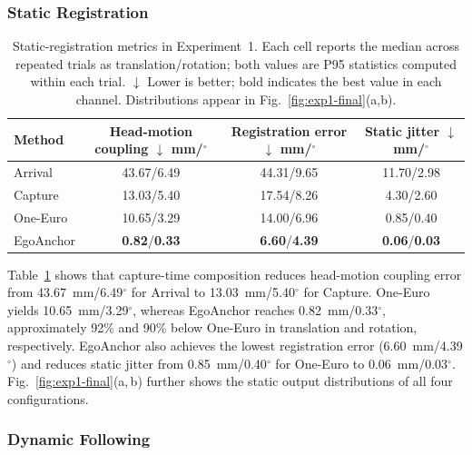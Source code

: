 \documentclass[review]{vgtc}
\begin{document}
\subsubsection{Static Registration}

\begin{table}[t]
\centering
\caption{Static-registration metrics in Experiment~1. Each cell reports the median across repeated trials as translation/rotation; both values are P95 statistics computed within each trial. $\downarrow$ Lower is better; bold indicates the best value in each channel. Distributions appear in Fig.~\ref{fig:exp1-final}(a,b).}
\label{tab:exp1-static}
\begin{tabular}{@{}lccc@{}}
\toprule
Method & \makecell{Head-motion\\coupling $\downarrow$\\mm/$^\circ$} & \makecell{Registration\\error $\downarrow$\\mm/$^\circ$} & \makecell{\\Static jitter $\downarrow$\\mm/$^\circ$} \\
\midrule
Arrival   & 43.67/6.49 & 44.31/9.65 & 11.70/2.98 \\
Capture   & 13.03/5.40 & 17.54/8.26 & 4.30/2.60 \\
One-Euro  & 10.65/3.29 & 14.00/6.96 & 0.85/0.40 \\
EgoAnchor & \textbf{0.82}/\textbf{0.33} & \textbf{6.60}/\textbf{4.39} & \textbf{0.06}/\textbf{0.03} \\
\bottomrule
\end{tabular}
\end{table}

Table~\ref{tab:exp1-static} shows that capture-time composition reduces head-motion coupling error from 43.67~mm/6.49$^\circ$ for Arrival to 13.03~mm/5.40$^\circ$ for Capture. One-Euro yields 10.65~mm/3.29$^\circ$, whereas EgoAnchor reaches 0.82~mm/0.33$^\circ$, approximately 92\% and 90\% below One-Euro in translation and rotation, respectively. EgoAnchor also achieves the lowest registration error (6.60~mm/4.39$^\circ$) and reduces static jitter from 0.85~mm/0.40$^\circ$ for One-Euro to 0.06~mm/0.03$^\circ$. Fig.~\ref{fig:exp1-final}(a,\,b) further shows the static output distributions of all four configurations.

\subsubsection{Dynamic Following}
\end{document}
